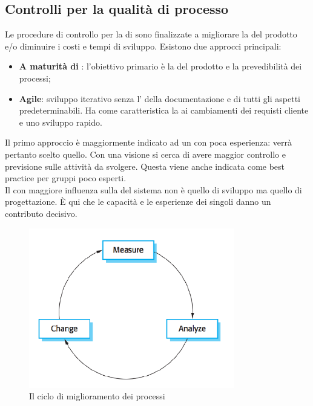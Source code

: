 \subsection{Controlli per la qualità di processo}
Le procedure di controllo per la  di  sono finalizzate a migliorare la  del prodotto e/o diminuire i costi e tempi di sviluppo. Esistono due approcci principali:
\begin{itemize}
\item \textbf{A maturità di }: l'obiettivo primario è la  del prodotto e la prevedibilità dei processi;
\item \textbf{Agile}: sviluppo iterativo senza l' della documentazione e di tutti gli aspetti predeterminabili. Ha come caratteristica la  ai cambiamenti dei requisti cliente e uno sviluppo rapido.
\end{itemize}
Il primo approccio è maggiormente indicato ad un  con poca esperienza: verrà pertanto scelto quello. Con una visione  si cerca di avere maggior controllo e previsione sulle attività da svolgere. Questa viene anche indicata come best practice per gruppi poco esperti.\\
Il  con maggiore influenza sulla  del sistema non è quello di sviluppo ma quello di progettazione. È qui che le capacità e le esperienze dei singoli danno un contributo decisivo.\\
\begin{figure}[h]
\centering \includegraphics[width=0.8\textwidth]{res/sections/processImprovement.png}
\caption{Il ciclo di miglioramento dei processi}
\end{figure}
